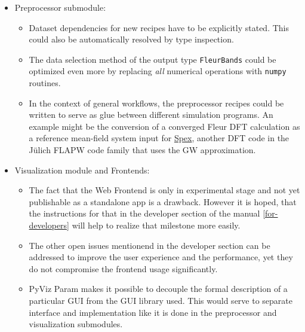 \begin{itemize}
\item Preprocessor submodule:
    \begin{itemize}
    \item Dataset dependencies for new recipes have to be explicitly stated.
        This could also be automatically resolved by type inspection.
    \item The data selection method of the output type \texttt{FleurBands} could
        be optimized even more by replacing \textit{all} numerical operations
        with \texttt{numpy} routines.
    \item In the context of general workflows, the preprocessor recipes could be
        written to serve as glue between different simulation programs. An
        example might be the conversion of a converged Fleur DFT calculation as
        a reference mean-field system input for
        \href{https://spex.readthedocs.io/en/master/spex_and_fleur.html#old-fleur}{Spex},
        another DFT code in the Jülich FLAPW code family that uses the GW
        approximation.
    \end{itemize}
\item Visualization module and Frontends:
    \begin{itemize}
    \item The fact that the Web Frontend is only in experimental stage and not
        yet publishable as a standalone app is a drawback. However it is hoped,
        that the instructions for that in the developer section of the manual
        \vref{for-developers} will help to realize that milestone more easily. 
    \item The other open issues mentionend in the developer section can be addressed to improve the user
        experience and the performance, yet they do not compromise the frontend
        usage significantly.
    \item PyViz Param \cite{pyviz-param} makes it possible to decouple the
        formal description of a particular GUI from the GUI library used. This
        would serve to separate interface and implementation like it is done in
        the preprocessor and visualization submodules.
    \end{itemize}
\end{itemize}


